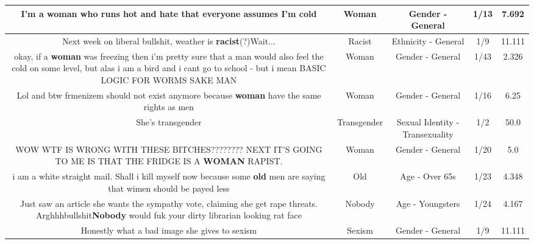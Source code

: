 \documentclass[11pt]{article}
\newlength\mylength
\begin{document}
\begin{center}
\begin{longtable}{|C{.65\mylength}|C{.30\mylength}|C{.12\mylength}|C{.12\mylength}|C{.12\mylength}|}
  \small I'm a \textbf{woman} who runs hot and hate that everyone assumes I'm cold\normalsize   & Woman & Gender - General & 1/13 & 7.692 \\  \hline
  \small Next week on liberal bullshit, weather is \textbf{racist}(?)Wait...\normalsize   & Racist & Ethnicity - General & 1/9 & 11.111 \\  \hline
  \small okay, if a \textbf{woman} was freezing then i'm pretty sure that a man would also feel the cold on some level, but alas i am a bird and i cant go to school - but i mean BASIC LOGIC FOR WORMS SAKE MAN\normalsize   & Woman & Gender - General & 1/43 & 2.326 \\  \hline
  \small Lol and btw frmenizem should not exist anymore because \textbf{woman} have the same rights as men\normalsize   & Woman & Gender - General & 1/16 & 6.25 \\  \hline
  \small She's transgender\normalsize   & Transgender & Sexual Identity - Transexuality & 1/2 & 50.0 \\  \hline
  \small WOW WTF IS WRONG WITH THESE BITCHES???????? NEXT IT'S  GOING TO ME IS THAT THE FRIDGE IS A \textbf{WOMAN} RAPIST.\normalsize   & Woman & Gender - General & 1/20 & 5.0 \\  \hline
  \small i am a white straight mail. Shall i kill myself now because some \textbf{old} men are saying that wimen should be payed less\normalsize   & Old & Age - Over 65s & 1/23 & 4.348 \\  \hline
  \small Just saw an article she wants the sympathy vote, claiming she get rape threats. Arghhhbullshit\textbf{Nobody} would fuk your dirty librarian looking rat face\normalsize   & Nobody & Age - Youngsters & 1/24 & 4.167 \\  \hline
  \small Honestly what a bad image she gives to sexism\normalsize   & Sexism & Gender - General & 1/9 & 11.111 \\  \hline

\end{longtable}
\end{center}
\end{document}
